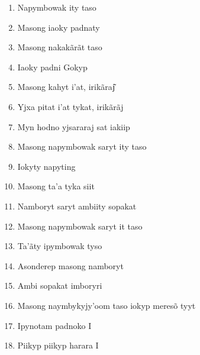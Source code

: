 \begin{enumerate}
\begin{center}\end{center}

\item Napymbowak ity taso
\item Masong iaoky padnaty
\item Masong nakakãrãt taso
\item Iaoky padni Gokyp

\begin{center}\end{center}

\item Masong kahyt i'at, irikãraj͂
\item Yjxa pitat i'at tykat, irikãrãj
\item Myn hodno yjsararaj sat iakiip

\begin{center}\end{center}

\item Masong napymbowak saryt ity taso
\item Iokyty napyting
\item Masong ta'a tyka siit

\begin{center}\end{center}

\item Namboryt saryt ambiity sopakat
\item Masong napymbowak saryt it taso
\item Ta'ãty ipymbowak tyso

\begin{center}\end{center}

\item Asonderep masong namboryt
\item Ambi sopakat imboryri
\item Masong naymbykyjy'oom taso iokyp meresõ tyyt
\item Ipynotam padnoko I
\item Piikyp piikyp harara I

\begin{center}\end{center}


\end{enumerate}
